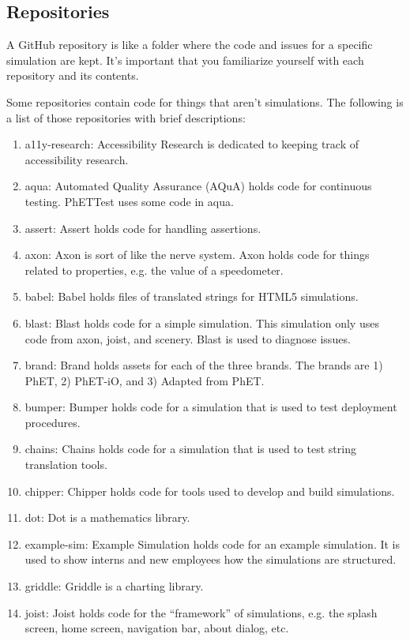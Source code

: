 \documentclass[titlepage]{article}
\begin{document}
	\subsection{Repositories}

A GitHub repository is like a folder where the code and issues for a specific simulation are kept. It's important that you familiarize yourself with each repository and its contents.

Some repositories contain code for things that aren't simulations. The following is a list of those repositories with brief descriptions:

		\begin{enumerate}
			\item a11y-research: Accessibility Research is dedicated to keeping track of accessibility research.
			\item aqua: Automated Quality Assurance (AQuA) holds code for continuous testing. PhETTest uses some code in aqua.
			\item assert: Assert holds code for handling assertions.
			\item axon: Axon is sort of like the nerve system. Axon holds code for things related to properties, e.g. the value of a speedometer.
			\item babel: Babel holds files of translated strings for HTML5 simulations.
			\item blast: Blast holds code for a simple simulation. This simulation only uses code from axon, joist, and scenery. Blast is used to diagnose issues.
			\item brand: Brand holds assets for each of the three brands. The brands are 1) PhET, 2) PhET-iO, and 3) Adapted from PhET.
			\item bumper: Bumper holds code for a simulation that is used to test deployment procedures.
			\item chains: Chains holds code for a simulation that is used to test string translation tools.
			\item chipper: Chipper holds code for tools used to develop and build simulations.
			\item dot: Dot is a mathematics library.
			\item example-sim: Example Simulation holds code for an example simulation. It is used to show interns and new employees how the simulations are structured.
			\item griddle: Griddle is a charting library.
			\item joist: Joist holds code for the ``framework'' of simulations, e.g. the splash screen, home screen, navigation bar, about dialog, etc.

\end{enumerate}
\end{document}
